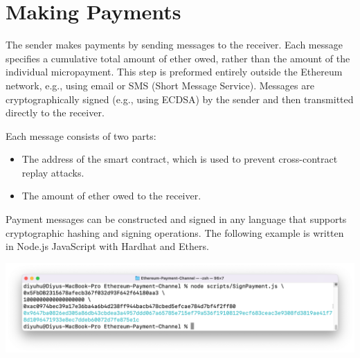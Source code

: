 \section{Making Payments}\label{sec:making-payments}
The sender makes payments by sending messages to the receiver.
Each message specifies a cumulative total amount of ether owed, rather than the amount of the individual micropayment.
This step is preformed entirely outside the Ethereum network, e.g., using email or SMS (Short Message Service).
Messages are cryptographically signed (e.g., using ECDSA) by the sender and then transmitted directly to the receiver.

Each message consists of two parts:
\begin{itemize}
    \item The address of the smart contract, which is used to prevent cross-contract replay attacks.
    \item The amount of ether owed to the receiver.
\end{itemize}

Payment messages can be constructed and signed in any language that supports cryptographic hashing and signing
operations.
The following example is written in Node.js JavaScript with Hardhat and Ethers.



\includegraphics[width=\textwidth]{./images/sign-message-example}